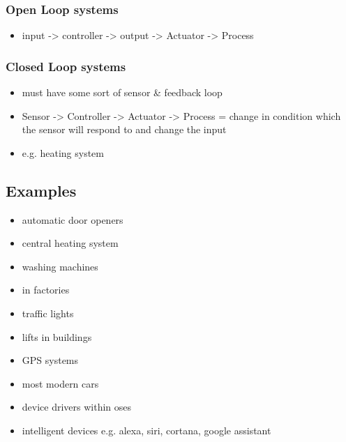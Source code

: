 \documentclass[11pt]{article}
\begin{document}
\subsubsection{Open Loop systems}
\label{sec:org3154943}
\begin{itemize}
\item input -> controller -> output -> Actuator -> Process
\end{itemize}
\subsubsection{Closed Loop systems}
\label{sec:org245fe46}
\begin{itemize}
\item must have some sort of sensor \& feedback loop
\item Sensor -> Controller -> Actuator -> Process = change in condition which the sensor will respond to and change the input
\item e.g. heating system
\end{itemize}
\subsection{Examples}
\label{sec:org2e2fd0d}
\begin{itemize}
\item automatic door openers
\item central heating system
\item washing machines
\item in factories
\item traffic lights
\item lifts in buildings
\item GPS systems
\item most modern cars
\item device drivers within oses
\item intelligent devices e.g. alexa, siri, cortana, google assistant
\end{itemize}
\end{document}

